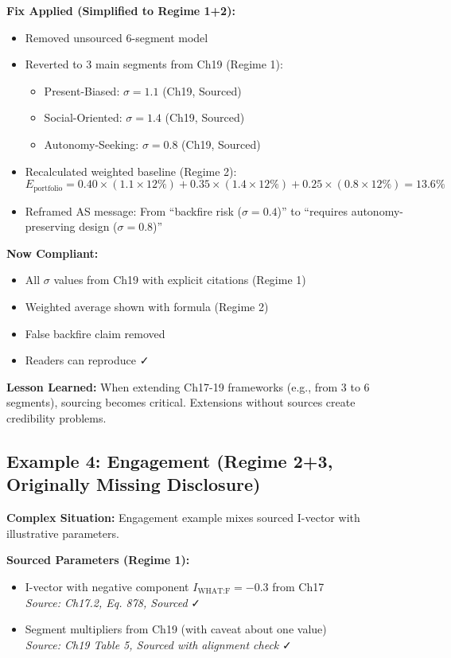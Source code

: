\textbf{Fix Applied (Simplified to Regime 1+2):}
\begin{itemize}[nosep]
\item Removed unsourced 6-segment model
\item Reverted to 3 main segments from Ch19 (Regime 1):
\begin{itemize}
\item Present-Biased: $\sigma = 1.1$ (Ch19, Sourced)
\item Social-Oriented: $\sigma = 1.4$ (Ch19, Sourced)
\item Autonomy-Seeking: $\sigma = 0.8$ (Ch19, Sourced)
\end{itemize}
\item Recalculated weighted baseline (Regime 2):
\begin{equation}
E_{\text{portfolio}} = 0.40 \times (1.1 \times 12\%) + 0.35 \times (1.4 \times 12\%) + 0.25 \times (0.8 \times 12\%) = 13.6\%
\label{eq:jjj-energie-weighted}
\end{equation}
\item Reframed AS message: From ``backfire risk ($\sigma = 0.4$)'' to ``requires autonomy-preserving design ($\sigma = 0.8$)''
\end{itemize}

\textbf{Now Compliant:}
\begin{itemize}[nosep]
\item All $\sigma$ values from Ch19 with explicit citations (Regime 1)
\item Weighted average shown with formula (Regime 2)
\item False backfire claim removed
\item Readers can reproduce ✓
\end{itemize}

\textbf{Lesson Learned:} When extending Ch17-19 frameworks (e.g., from 3 to 6 segments), sourcing becomes critical. Extensions without sources create credibility problems.

\subsection{Example 4: Engagement (Regime 2+3, Originally Missing Disclosure)}
\label{subsec:jjj-engagement}

\textbf{Complex Situation:} Engagement example mixes sourced I-vector with illustrative parameters.

\textbf{Sourced Parameters (Regime 1):}
\begin{itemize}[nosep]
\item I-vector with negative component $I_{\text{WHAT:F}} = -0.3$ from Ch17
\\ \textit{Source: Ch17.2, Eq. 878, Sourced} ✓
\item Segment multipliers from Ch19 (with caveat about one value)
\\ \textit{Source: Ch19 Table 5, Sourced with alignment check} ✓
\end{itemize}

